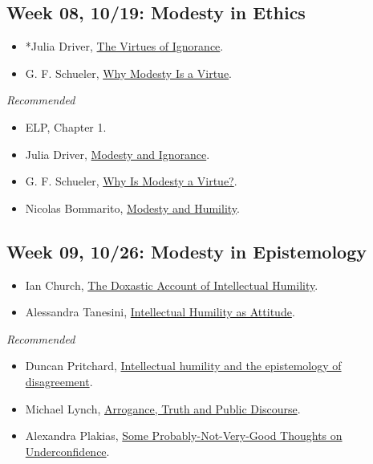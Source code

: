 \documentclass[
]{article}
\providecommand{\tightlist}{%
  \setlength{\itemsep}{0pt}\setlength{\parskip}{0pt}}
\begin{document}
\hypertarget{week-08-1019-modesty-in-ethics}{%
\subsection{Week 08, 10/19: Modesty in
Ethics}\label{week-08-1019-modesty-in-ethics}}

\begin{itemize}
\tightlist
\item
  *Julia Driver, \href{https://www.jstor.org/stable/2027146}{The Virtues
  of Ignorance}.
\item
  G. F. Schueler, \href{https://www.jstor.org/stable/2382326}{Why
  Modesty Is a Virtue}.
\end{itemize}

\emph{Recommended}

\begin{itemize}
\tightlist
\item
  ELP, Chapter 1.
\item
  Julia Driver,
  \href{https://www.jstor.org/stable/10.1086/233947}{Modesty and
  Ignorance}.
\item
  G. F. Schueler, \href{https://doi.org/10.1086/233948}{Why Is Modesty a
  Virtue?}.
\item
  Nicolas Bommarito,
  \href{https://plato.stanford.edu/entries/modesty-humility/}{Modesty
  and Humility}.
\end{itemize}

\hypertarget{week-09-1026-modesty-in-epistemology}{%
\subsection{Week 09, 10/26: Modesty in
Epistemology}\label{week-09-1026-modesty-in-epistemology}}

\begin{itemize}
\tightlist
\item
  Ian Church,
  \href{http://logos-and-episteme.acadiasi.ro/the-doxastic-account-of-intellectual-humility-pages-413-433/}{The
  Doxastic Account of Intellectual Humility}.
\item
  Alessandra Tanesini,
  \href{https://onlinelibrary.wiley.com/doi/abs/10.1111/phpr.12326}{Intellectual
  Humility as Attitude}.
\end{itemize}

\emph{Recommended}

\begin{itemize}
\tightlist
\item
  Duncan Pritchard,
  \href{https://link-springer-com.proxy.lib.umich.edu/article/10.1007\%2Fs11229-018-02024-5}{Intellectual
  humility and the epistemology of disagreement}.
\item
  Michael Lynch,
  \href{https://www.cambridge.org/core/journals/episteme/article/abs/arrogance-truth-and-public-discourse/EB7618E77489F730D5020C3B88119285}{Arrogance,
  Truth and Public Discourse}.
\item
  Alexandra Plakias,
  \href{https://link.springer.com/article/10.1007/s10677-020-10093-0}{Some
  Probably-Not-Very-Good Thoughts on Underconfidence}.
\end{itemize}
\end{document}
